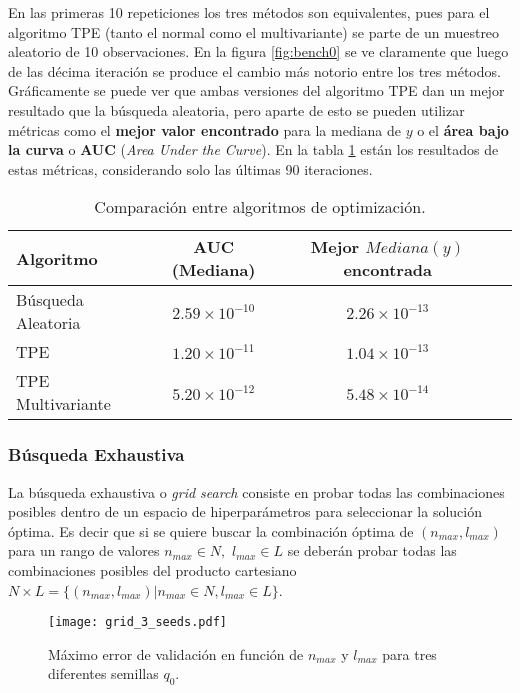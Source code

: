 En las primeras 10 repeticiones los tres métodos son equivalentes, pues para el algoritmo TPE (tanto el normal como el multivariante) se parte de un muestreo aleatorio de 10 observaciones. En la figura \ref{fig:bench0} se ve claramente que luego de las décima iteración se produce el cambio más notorio entre los tres métodos. Gráficamente se puede ver que ambas versiones del algoritmo TPE dan un mejor resultado que la búsqueda aleatoria, pero aparte de esto se pueden utilizar métricas como el \textbf{mejor valor encontrado} para la mediana de $y$ o el \textbf{área bajo la curva} o \textbf{AUC} (\textit{Area Under the Curve})\cite{Dewancker2016ASF}. En la tabla \ref{tab:comp1} están los resultados de estas métricas, considerando solo las últimas 90 iteraciones.


\begin{table}
\centering
\begin{tabular}{@{}lccc@{}}
\toprule
\textbf{Algoritmo} & AUC (Mediana) & Mejor $Mediana(y)$ encontrada \\ 
\midrule
Búsqueda Aleatoria & $2.59\times 10^{-10}$ & $2.26\times 10^{-13}$ \\ 
TPE & $1.20\times 10^{-11}$ & $1.04\times 10^{-13}$ \\ 
TPE Multivariante & $5.20\times 10^{-12}$ & $5.48\times 10^{-14}$ \\ 
\bottomrule
\end{tabular} 
\caption{Comparación entre algoritmos de optimización.}
\label{tab:comp1}
\end{table}

\subsubsection*{Búsqueda Exhaustiva}
La búsqueda exhaustiva o \textit{grid search} consiste en probar todas las combinaciones posibles dentro de un espacio de hiperparámetros para seleccionar la solución óptima. Es decir que si se quiere buscar la combinación óptima de $(n_{max}, l_{max})$ para un rango de valores $n_{max} \in N,$ $l_{max} \in L$ se deberán probar todas las combinaciones posibles del producto cartesiano $N \times L = \{(n_{max}, l_{max}) | n_{max} \in N, l_{max} \in L\}$. 

\begin{figure}[h!]
\centering
\texttt{[image: grid\_3\_seeds.pdf]}
\caption{Máximo error de validación en función de $n_{max}$ y $l_{max}$ para tres diferentes semillas $q_0$. }
\label{fig:grid_3_seeds}
\end{figure}

